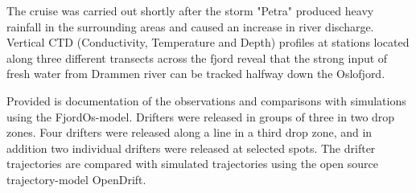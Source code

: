 \documentclass[12pt,a4paper,english]{article}
\begin{document}
The cruise was carried out shortly after the storm "Petra" produced heavy rainfall in the surrounding areas and caused an increase in river discharge. Vertical CTD (Conductivity, Temperature and Depth) profiles at stations located along three different transects across the fjord reveal that the strong input of fresh water from Drammen river can be tracked halfway down the Oslofjord.

Provided is documentation of the observations and comparisons with simulations using the FjordOs-model. Drifters were released in groups of three in two drop zones. Four drifters were released along a line in a third drop zone, and in addition two individual drifters were released at selected spots. The drifter trajectories are compared with simulated trajectories using the open source trajectory-model OpenDrift.

\clearpage

\vfill

\end{document}
